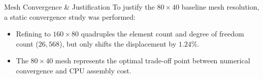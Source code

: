 \begin{frame}{Mesh Convergence \& Justification}
    To justify the $80 \times 40$ baseline mesh resolution, a static convergence study was performed:
    \begin{table}
        \centering
    \end{table}
    \begin{itemize}
        \item Refining to $160 \times 80$ quadruples the element count and degree of freedom count ($26,568$), but only shifts the displacement by $1.24\%$.
        \item The $80 \times 40$ mesh represents the optimal trade-off point between numerical convergence and CPU assembly cost.
    \end{itemize}
\end{frame}
